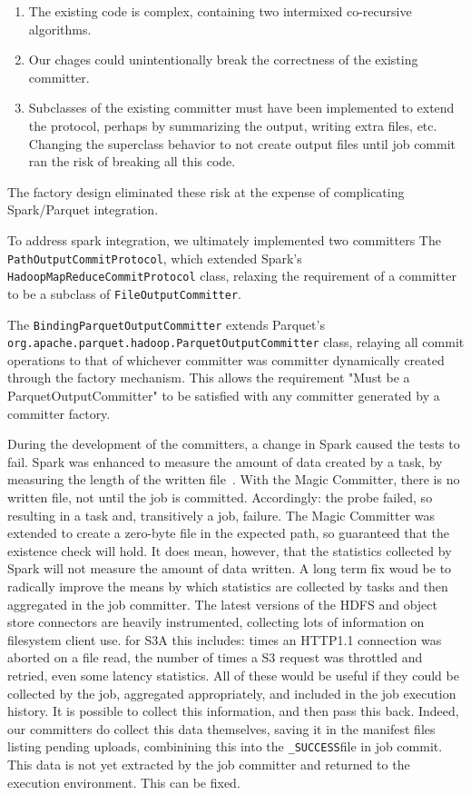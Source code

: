 \documentclass[conference]{IEEEtran}
\newcommand{\SUCCESS}{\texttt{\_SUCCESS}}
\begin{document}
\begin{enumerate}
  \item The existing code is complex, containing two intermixed co-recursive
  algorithms.
  \item Our chages could unintentionally break the correctness of the existing committer.
  \item Subclasses of the existing committer must have been implemented to extend
  the protocol, perhaps by summarizing the output, writing extra files, etc.
  Changing the superclass behavior to not create output files until job commit
  ran the risk of breaking all this code.
\end{enumerate}

The factory design eliminated these risk at the expense of complicating
Spark/Parquet integration.

To address spark integration, we ultimately implemented two committers
The \texttt{PathOutputCommitProtocol}, which extended Spark's
\texttt{HadoopMapReduceCommitProtocol} class, relaxing the requirement of a
committer to be a subclass of \texttt{FileOutputCommitter}.

The \texttt{BindingParquetOutputCommitter} extends Parquet's
\texttt{org.apache.parquet.hadoop.ParquetOutputCommitter} class, relaying
all commit operations to that of whichever committer was committer dynamically created
through the factory mechanism.
This allows the requirement "Must be a ParquetOutputCommitter" to be satisfied
with any committer generated by a committer factory.

During the development of the committers, a change in Spark caused the
tests to fail.
Spark was enhanced to measure the amount of data created by a task, by
measuring the length of the written file\ \cite{SPARK-21669}.
With the Magic Committer, there is no written file, not until the job is committed.
Accordingly: the probe failed, so resulting in a task and, transitively a job, failure.
The Magic Committer was extended to create a zero-byte file in the expected path,
so guaranteed that the existence check will hold.
It does mean, however, that the statistics collected by Spark will not measure
the amount of data written.
A long term fix woud be to radically improve the means by which statistics are
collected by tasks and then aggregated in the job committer.
The latest versions of the HDFS and object store connectors are heavily instrumented,
collecting lots of information on filesystem client use.
for S3A this includes: times an HTTP1.1 connection was aborted on a file read,
the number of times a S3 request was throttled and retried,
even some latency statistics.
All of these would be useful if they could be collected by the job, aggregated
appropriately, and included in the job execution history.
It is possible to collect this information, and then pass this back.
Indeed, our committers do collect this data themselves, saving it in the
manifest files listing pending uploads, combinining this into the \SUCCESS file
in job commit.
This data is not yet extracted by the job committer and returned to the execution
environment.
This can be fixed.
\end{document}
